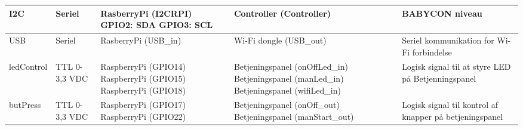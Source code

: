 \begin{center}
\begin{longtable}{|p{}|p{}|p{}|p{}|p{3cm}|}
I2C			
&Seriel		
&RasberryPi \newline (I2CRPI) \newline	
	GPIO2: SDA \newline	
	GPIO3: SCL \newline	
&Controller \newline (Controller) 			
&BABYCON niveau
\\\hline

USB		
&Seriel				
&RasberryPi \newline (USB\_in) 			
&Wi-Fi dongle \newline (USB\_out) \newline	
&Seriel kommunikation for Wi-Fi forbindelse
\\\hline

ledControl
&TTL 0-3,3 VDC		
&RaspberryPi \newline (GPIO14) \newline
 RaspberryPi \newline (GPIO15) \newline
 RaspberryPi \newline (GPIO18)
&Betjeningspanel \newline (onOffLed\_in) \newline
 Betjeningspanel \newline (manLed\_in) \newline
 Betjeningspanel \newline (wifiLed\_in)
&Logisk signal til at styre LED på Betjenningspanel
\\\hline

butPress
&TTL 0-3,3 VDC		
&RaspberryPi \newline (GPIO17) \newline
 RaspberryPi \newline (GPIO22)
&Betjeningspanel \newline (onOff\_out) \newline
 Betjeningspanel \newline (manStart\_out)
&Logisk signal til kontrol af knapper på betjeningspanel
\\\hline

\end{longtable}
\end{center}